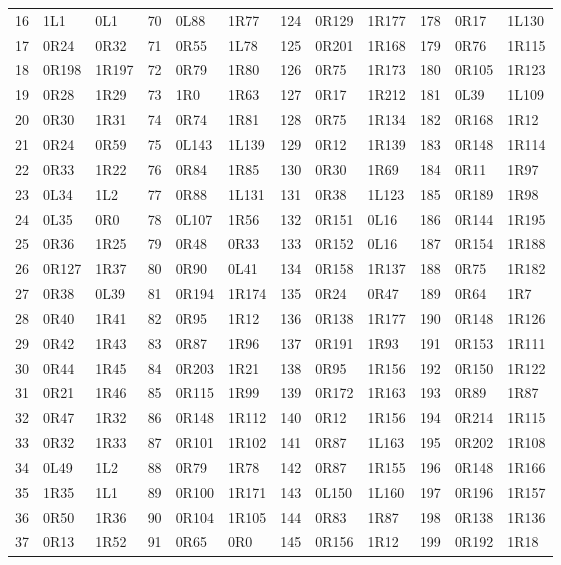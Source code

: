\begin{longtable}{rll@{\hspace{1em}}rll@{\hspace{1em}}rll@{\hspace{1em}}rll}
16 & 1L1 & 0L1 & 70 & 0L88 & 1R77 & 124 & 0R129 & 1R177 & 178 & 0R17 & 1L130\\
17 & 0R24 & 0R32 & 71 & 0R55 & 1L78 & 125 & 0R201 & 1R168 & 179 & 0R76 & 1R115\\
18 & 0R198 & 1R197 & 72 & 0R79 & 1R80 & 126 & 0R75 & 1R173 & 180 & 0R105 & 1R123\\
19 & 0R28 & 1R29 & 73 & 1R0 & 1R63 & 127 & 0R17 & 1R212 & 181 & 0L39 & 1L109\\
20 & 0R30 & 1R31 & 74 & 0R74 & 1R81 & 128 & 0R75 & 1R134 & 182 & 0R168 & 1R12\\
21 & 0R24 & 0R59 & 75 & 0L143 & 1L139 & 129 & 0R12 & 1R139 & 183 & 0R148 & 1R114\\
22 & 0R33 & 1R22 & 76 & 0R84 & 1R85 & 130 & 0R30 & 1R69 & 184 & 0R11 & 1R97\\
23 & 0L34 & 1L2 & 77 & 0R88 & 1L131 & 131 & 0R38 & 1L123 & 185 & 0R189 & 1R98\\
24 & 0L35 & 0R0 & 78 & 0L107 & 1R56 & 132 & 0R151 & 0L16 & 186 & 0R144 & 1R195\\
25 & 0R36 & 1R25 & 79 & 0R48 & 0R33 & 133 & 0R152 & 0L16 & 187 & 0R154 & 1R188\\
26 & 0R127 & 1R37 & 80 & 0R90 & 0L41 & 134 & 0R158 & 1R137 & 188 & 0R75 & 1R182\\
27 & 0R38 & 0L39 & 81 & 0R194 & 1R174 & 135 & 0R24 & 0R47 & 189 & 0R64 & 1R7\\
28 & 0R40 & 1R41 & 82 & 0R95 & 1R12 & 136 & 0R138 & 1R177 & 190 & 0R148 & 1R126\\
29 & 0R42 & 1R43 & 83 & 0R87 & 1R96 & 137 & 0R191 & 1R93 & 191 & 0R153 & 1R111\\
30 & 0R44 & 1R45 & 84 & 0R203 & 1R21 & 138 & 0R95 & 1R156 & 192 & 0R150 & 1R122\\
31 & 0R21 & 1R46 & 85 & 0R115 & 1R99 & 139 & 0R172 & 1R163 & 193 & 0R89 & 1R87\\
32 & 0R47 & 1R32 & 86 & 0R148 & 1R112 & 140 & 0R12 & 1R156 & 194 & 0R214 & 1R115\\
33 & 0R32 & 1R33 & 87 & 0R101 & 1R102 & 141 & 0R87 & 1L163 & 195 & 0R202 & 1R108\\
34 & 0L49 & 1L2 & 88 & 0R79 & 1R78 & 142 & 0R87 & 1R155 & 196 & 0R148 & 1R166\\
35 & 1R35 & 1L1 & 89 & 0R100 & 1R171 & 143 & 0L150 & 1L160 & 197 & 0R196 & 1R157\\
36 & 0R50 & 1R36 & 90 & 0R104 & 1R105 & 144 & 0R83 & 1R87 & 198 & 0R138 & 1R136\\
37 & 0R13 & 1R52 & 91 & 0R65 & 0R0 & 145 & 0R156 & 1R12 & 199 & 0R192 & 1R18\\

\end{longtable}
